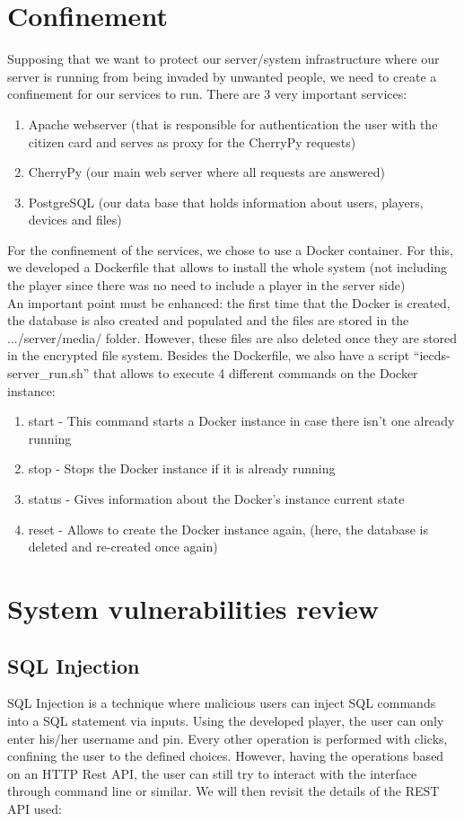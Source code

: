 \documentclass[11pt,a4paper]{report}
\begin{document}
\chapter{Confinement}
\label{sec:docker}
Supposing that we want to protect our server/system infrastructure where our server is running from being invaded by unwanted people, we need to create a confinement for our services to run.
There are 3 very important services:
\begin{enumerate}
    \item Apache webserver (that is responsible for authentication the user with the citizen card and serves as proxy for the CherryPy requests)
\item CherryPy (our main web server where all requests are answered)
\item PostgreSQL (our data base that holds information about users, players, devices and files)
\end{enumerate}

For the confinement of the services, we chose to use a Docker container. For this, we developed a Dockerfile that allows to install the whole system (not including the player since there was no need to include a player in the server side)\\
An important point must be enhanced: the first time that the Docker is created, the database is also created and populated and the files are stored in the .../server/media/ folder. However, these files are also deleted once they are stored in the encrypted file system.
Besides the Dockerfile, we also have a script ``iecds-server\_run.sh'' that allows to execute 4 different commands on the Docker instance:
\begin{enumerate}
\item start - This command starts a Docker instance in case there isn't one already running
\item stop - Stops the Docker instance if it is already running
\item status - Gives information about the Docker's instance current state
\item reset - Allows to create the Docker instance again, (here, the database is deleted and re-created once again)
\end{enumerate}

\chapter{System vulnerabilities review}
\section{SQL Injection}
SQL Injection is a technique where malicious users can inject SQL commands into a SQL statement via inputs.
\newline
Using the developed player, the user can only enter his/her username and pin. Every other operation is performed with clicks, confining the user to the defined choices.
\newline
However, having the operations based on an HTTP Rest API, the user can still try to interact with the interface through command line or similar. We will then revisit the details of the REST API used:
\end{document}

